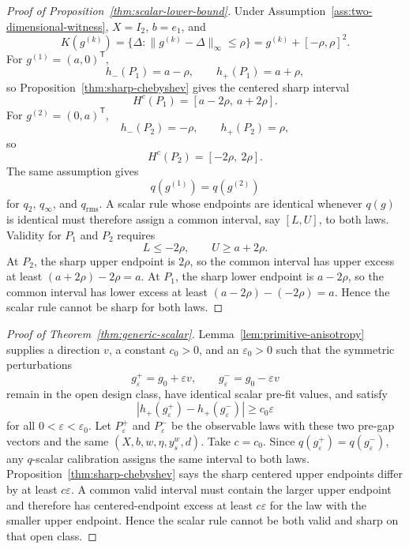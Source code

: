 \documentclass[11pt]{article}
\newcommand{\transpose}{\mathsf{T}}
\theoremstyle{definition}
\theoremstyle{plain}
\theoremstyle{remark}
\begin{document}
\begin{proof}[Proof of Proposition~\ref{thm:scalar-lower-bound}]
Under Assumption~\ref{ass:two-dimensional-witness}, \(X=I_2\), \(b=e_1\), and
\[
K(g^{(k)})=\{\Delta:\|g^{(k)}-\Delta\|_\infty\le\rho\}
          =g^{(k)}+[-\rho,\rho]^2 .
\]
For \(g^{(1)}=(a,0)^\transpose\),
\[
h_-(P_1)=a-\rho,\qquad h_+(P_1)=a+\rho,
\]
so Proposition~\ref{thm:sharp-chebyshev} gives the centered sharp interval
\[
H^c(P_1)=[a-2\rho,\ a+2\rho].
\]
For \(g^{(2)}=(0,a)^\transpose\),
\[
h_-(P_2)=-\rho,\qquad h_+(P_2)=\rho,
\]
so
\[
H^c(P_2)=[-2\rho,\ 2\rho].
\]
The same assumption gives
\[
q(g^{(1)})=q(g^{(2)})
\]
for \(q_2\), \(q_\infty\), and \(q_{\mathrm{rms}}\).  A scalar rule whose
endpoints are identical whenever \(q(g)\) is identical must therefore assign a
common interval, say \([L,U]\), to both laws.  Validity for \(P_1\) and \(P_2\)
requires
\[
L\le -2\rho,\qquad U\ge a+2\rho.
\]
At \(P_2\), the sharp upper endpoint is \(2\rho\), so the common interval has
upper excess at least \((a+2\rho)-2\rho=a\).  At \(P_1\), the sharp lower
endpoint is \(a-2\rho\), so the common interval has lower excess at least
\((a-2\rho)-(-2\rho)=a\).  Hence the scalar rule cannot be sharp for both laws.
\end{proof}

\begin{proof}[Proof of Theorem~\ref{thm:generic-scalar}]
Lemma~\ref{lem:primitive-anisotropy} supplies a direction \(v\), a constant
\(c_0>0\), and an \(\varepsilon_0>0\) such that the symmetric perturbations
\[
g_\varepsilon^+=g_0+\varepsilon v,\qquad
g_\varepsilon^-=g_0-\varepsilon v
\]
remain in the open design class, have identical scalar pre-fit values, and
satisfy
\[
\left|h_+(g_\varepsilon^+)-h_+(g_\varepsilon^-)\right|
\ge c_0\varepsilon
\]
for all \(0<\varepsilon<\varepsilon_0\).  Let \(P_\varepsilon^+\) and
\(P_\varepsilon^-\) be the observable laws with these two pre-gap vectors and
the same \((X,b,w,\eta,y_s^w,d)\).  Take \(c=c_0\).  Since
\(q(g_\varepsilon^+)=q(g_\varepsilon^-)\), any \(q\)-scalar calibration assigns
the same interval to both laws.  Proposition~\ref{thm:sharp-chebyshev} says the
sharp centered upper endpoints differ by at least \(c\varepsilon\).  A common
valid interval must contain the larger upper endpoint and therefore has
centered-endpoint excess at least \(c\varepsilon\) for the law with the smaller
upper endpoint.  Hence the scalar rule cannot be both valid and sharp on that
open class.
\end{proof}
\end{document}
